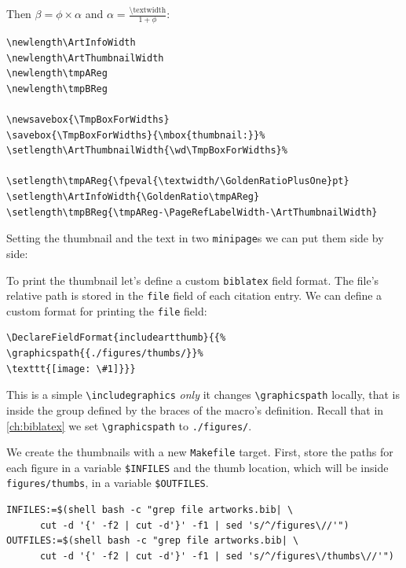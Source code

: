 \documentclass[12pt,a4,oneside,usenames,dvipsnames]{book}
\newcommand\biblatex{\texttt{biblatex}\xspace}%
\begin{document}
Then $β=\phi\times{}α$ and $α=\frac{\text{\textbackslash{}textwidth}}{1+\phi{}}$:

\begin{verbatim}
\newlength\ArtInfoWidth
\newlength\ArtThumbnailWidth
\newlength\tmpAReg
\newlength\tmpBReg

\newsavebox{\TmpBoxForWidths}
\savebox{\TmpBoxForWidths}{\mbox{thumbnail:}}%
\setlength\ArtThumbnailWidth{\wd\TmpBoxForWidths}%

\setlength\tmpAReg{\fpeval{\textwidth/\GoldenRatioPlusOne}pt}
\setlength\ArtInfoWidth{\GoldenRatio\tmpAReg}
\setlength\tmpBReg{\tmpAReg-\PageRefLabelWidth-\ArtThumbnailWidth}
\end{verbatim}

Setting the thumbnail and the text in two \texttt{minipage}s we can put
them side by side:

\begin{figure}
{\centering%
%
\skelcaption[width=0.2\textwidth,lines=1]{}}
\end{figure}

To print the thumbnail let's define a custom \biblatex field
format. The file's relative path is stored in the \texttt{file} field of
each citation entry. We can define a custom format for printing the
\texttt{file} field:

\begin{verbatim}
\DeclareFieldFormat{includeartthumb}{{%
\graphicspath{{./figures/thumbs/}}%
\texttt{[image: \#1]}}}
\end{verbatim}

This is a simple \texttt{\textbackslash{}includegraphics} \emph{only} it changes
\texttt{\textbackslash{}graphicspath} locally, that is inside the group
defined by the braces of the macro's definition. Recall that in
\autoref{ch:biblatex} we set \texttt{\textbackslash{}graphicspath} to
\texttt{./figures/}.

We create the thumbnails with a new \texttt{Makefile} target. First,
store the paths for each figure in a variable \texttt{\$INFILES} and the
thumb location, which will be inside \texttt{figures/thumbs}, in a
variable \texttt{\$OUTFILES}.

\begin{verbatim}
INFILES:=$(shell bash -c "grep file artworks.bib| \
      cut -d '{' -f2 | cut -d'}' -f1 | sed 's/^/figures\//'")
OUTFILES:=$(shell bash -c "grep file artworks.bib| \
      cut -d '{' -f2 | cut -d'}' -f1 | sed 's/^/figures\/thumbs\//'")
\end{verbatim}
\end{document}
